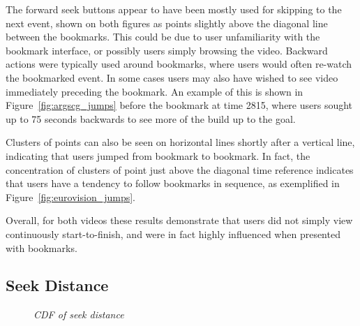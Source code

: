 \documentclass[a4paper,11pt]{article}
\newcommand{\capttext}{\protect\centering\em}
\begin{document}
The forward seek buttons appear to have been mostly used for skipping to the next event, shown on both figures as points slightly above the diagonal line between the bookmarks. This could be due to user unfamiliarity with the bookmark interface, or possibly users simply browsing the video. Backward actions were typically used around bookmarks, where users would often re-watch the bookmarked event. In some cases users may also have wished to see video immediately preceding the bookmark. An example of this is shown in Figure~\ref{fig:argscg_jumps} before the bookmark at time 2815, where users sought up to 75 seconds backwards to see more of the build up to the goal.

Clusters of points can also be seen on horizontal lines shortly after a vertical line, indicating that users jumped from bookmark to bookmark. In fact, the concentration of clusters of point just above the diagonal time reference indicates that users have a tendency to follow bookmarks in sequence, as exemplified in Figure~\ref{fig:eurovision_jumps}.

Overall, for both videos these results demonstrate that users did not simply view continuously start-to-finish, and were in fact highly influenced when presented with bookmarks.

\subsection{Seek Distance}

\begin{figure}[tbp]
    \centering


    \caption{\capttext CDF of seek distance}
    \label{fig:seek_distance}
\end{figure}
\end{document}
